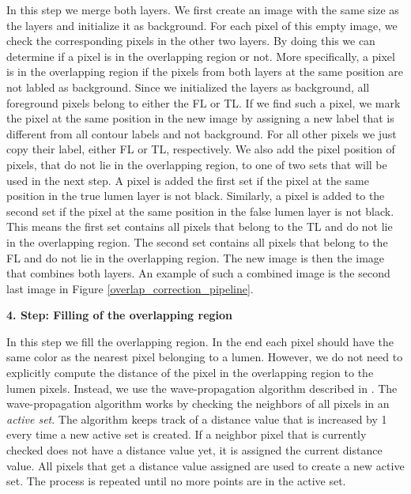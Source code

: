 \documentclass[thesis.tex]{subfiles}
\begin{document}
In this step we merge both layers. We first create an image with the same size as the layers and initialize it as background. For each pixel of this empty image, we check the corresponding pixels in the other two layers. By doing this we can determine if a pixel is in the overlapping region or not. More specifically, a pixel is in the overlapping region if the pixels from both layers at the same position are not labled as background. Since we initialized the layers as background, all foreground pixels belong to either the FL or TL. If we find such a pixel, we mark the pixel at the same position in the new image by assigning a new label that is different from all contour labels and not background. For all other pixels we just copy their label, either FL or TL, respectively. We also add the pixel position of pixels, that do not lie in the overlapping region, to one of two sets that will be used in the next step. A pixel is added the first set if the pixel at the same position in the true lumen layer is not black. Similarly, a pixel is added to the second set if the pixel at the same position in the false lumen layer is not black. This means the first set contains all pixels that belong to the TL and do not lie in the overlapping region. The second set contains all pixels that belong to the FL and do not lie in the overlapping region. The new image is then the image that combines both layers. An example of such a combined image is the second last image in Figure \ref{overlap_correction_pipeline}.

\textbf{4. Step: Filling of the overlapping region}

In this step we fill the overlapping region. In the end each pixel should have the same color as the nearest pixel belonging to a lumen. However, we do not need to explicitly compute the distance of the pixel in the overlapping region to the lumen pixels. Instead, we use the wave-propagation algorithm described in \cite{porikli2007fast}. The wave-propagation algorithm works by checking the neighbors of all pixels in an \textit{active set}. The algorithm keeps track of a distance value that is increased by 1 every time a new active set is created. If a neighbor pixel that is currently checked does not have a distance value yet, it is assigned the current distance value. All pixels that get a distance value assigned are used to create a new active set. The process is repeated until no more points are in the active set.
\end{document}
